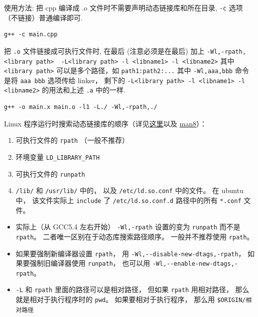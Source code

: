 使用方法:
把 cpp 编译成 .o 文件时不需要声明动态链接库和所在目录, \verb`-c` 选项（不链接）普通编译即可.
\begin{lstlisting}[language=none]
g++ -c main.cpp
\end{lstlisting}
把 \verb`.o` 文件链接成可执行文件时, 在最后 (注意必须是在最后) 加上
\verb`-Wl,-rpath,<library path>  -L<library path> -l <libname1> -l <libname2>` 其中 \verb`<library path>` 可以是多个路径，如 \verb`path1:path2:...`
其中 \verb`-Wl,aaa,bbb` 命令是将 \verb`aaa bbb` 选项传给 linker， 剩下的 \verb`-L<library path> -l <libname1> -l <libname2>` 的用法和上述 \verb`.a` 中的一样.

\begin{lstlisting}[language=none]
g++ -o main.x main.o -l1 -L./ -Wl,-rpath,./
\end{lstlisting}

Linux 程序运行时搜索动态链接库的顺序（详见\href{https://unix.stackexchange.com/questions/22926/where-do-executables-look-for-shared-objects-at-runtime}{这里}以及 \href{https://man7.org/linux/man-pages/man8/ld.so.8.html}{man8}）：
\begin{enumerate}
\item 可执行文件的 \verb`rpath` （一般不推荐）
\item 环境变量 \verb`LD_LIBRARY_PATH`
\item 可执行文件的 \verb`runpath`
\item \verb`/lib/` 和 \verb`/usr/lib/` 中的， 以及 \verb`/etc/ld.so.conf` 中的文件。 在 ubuntu 中， 该文件实际上 \verb`include` 了 \verb`/etc/ld.so.conf.d` 路径中的所有 \verb`*.conf` 文件。
\end{enumerate}

\begin{itemize}
\item 实际上（从 GCC5.4 左右开始） \verb`-Wl,-rpath` 设置的变为 \verb`runpath` 而不是 \verb`rpath`。 二者唯一区别在于动态库搜索路径顺序。 一般并不推荐使用 \verb`rpath`。
\item 如果要强制新编译器设置 \verb`rpath`， 用 \verb`-Wl,--disable-new-dtags,-rpath`， 如果要强制旧编译器使用 \verb`runpath`， 也可以用 \verb`-Wl,--enable-new-dtags,-rpath`。
\item \verb`-L` 和 \verb`rpath` 里面的路径可以是相对路径， 但如果 \verb`rpath` 用相对路径， 那么就是相对于执行程序时的 \verb`pwd`。 如果要相对于执行程序， 那么用 \verb`$ORIGIN/相对路径`
\end{itemize}

